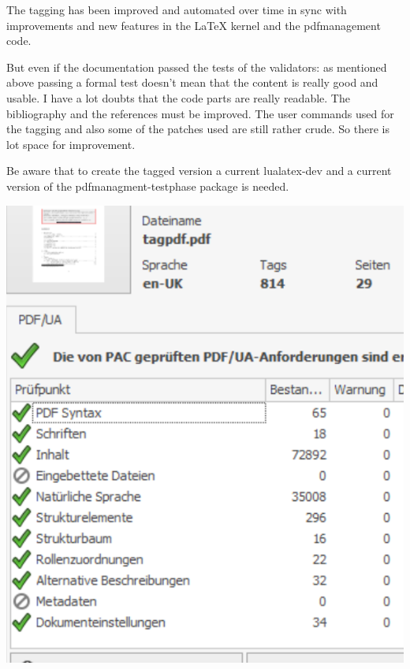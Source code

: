 \documentclass[DIV=12,parskip=half-,bibliography=totoc]{scrartcl}
\begin{document}
The tagging has been improved and automated over time in sync with improvements and new features in the LaTeX kernel and the pdfmanagement code.

But even if the documentation passed the tests of the validators:  as mentioned above passing a formal test doesn't mean that the content is really good and usable. I have a lot doubts that the code parts are really readable. The bibliography and the references must be improved. The user commands used for the tagging and also some of the patches used are still rather crude. So there is lot space for improvement.

\begin{tcolorbox}[before upper=\tagpdfparaOn]
Be aware that to create the tagged version a current lualatex-dev and a current version of the pdfmanagment-testphase package is needed.
\end{tcolorbox}

\tagpdfparaOff

\includegraphics{pac3}
\tagmcend\tagstructend

\tagpdfparaOn
\end{document}
